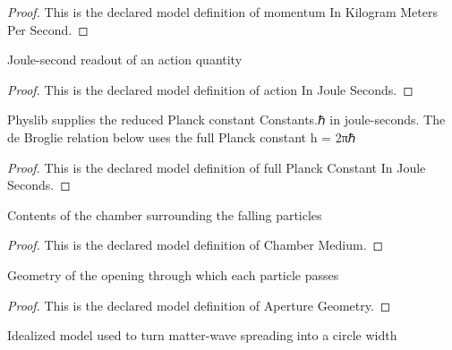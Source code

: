 \begin{proof}
  This is the declared model definition of momentum In Kilogram Meters Per Second.
\end{proof}
\begin{definition}
  \label{def:physics:phyx-mini-0655:phyxminiproblems-problemphyxmini0655-actioninjouleseconds}
  Joule-second readout of an action quantity
\end{definition}
\begin{proof}
  This is the declared model definition of action In Joule Seconds.
\end{proof}
\begin{definition}
  \label{def:physics:phyx-mini-0655:phyxminiproblems-problemphyxmini0655-fullplanckconstantinjouleseconds}
  Physlib supplies the reduced Planck constant Constants.ℏ in joule-seconds. The de Broglie relation below uses the full Planck constant h = 2πℏ
\end{definition}
\begin{proof}
  This is the declared model definition of full Planck Constant In Joule Seconds.
\end{proof}
\begin{definition}
  \label{def:physics:phyx-mini-0655:phyxminiproblems-problemphyxmini0655-chambermedium}
  Contents of the chamber surrounding the falling particles
\end{definition}
\begin{proof}
  This is the declared model definition of Chamber Medium.
\end{proof}
\begin{definition}
  \label{def:physics:phyx-mini-0655:phyxminiproblems-problemphyxmini0655-aperturegeometry}
  Geometry of the opening through which each particle passes
\end{definition}
\begin{proof}
  This is the declared model definition of Aperture Geometry.
\end{proof}
\begin{definition}
  \label{def:physics:phyx-mini-0655:phyxminiproblems-problemphyxmini0655-broadeningmodel}
  Idealized model used to turn matter-wave spreading into a circle width
\end{definition}

